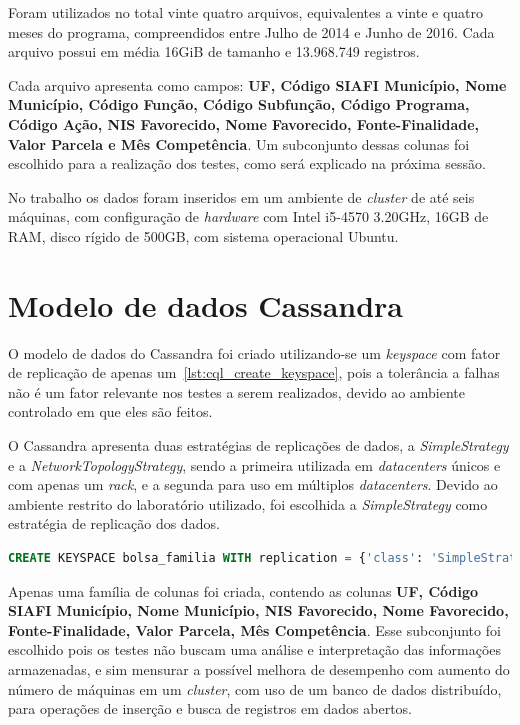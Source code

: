 Foram utilizados no total vinte quatro arquivos, equivalentes a vinte e quatro meses do programa, compreendidos entre Julho de 2014 e Junho de 2016. Cada arquivo possui em média 16GiB de tamanho e 13.968.749 registros.

Cada arquivo apresenta como campos: \textbf{UF, Código SIAFI Município, Nome Município, Código Função, Código Subfunção, Código Programa, Código Ação, NIS Favorecido, Nome Favorecido, Fonte-Finalidade, Valor Parcela e Mês Competência}. Um subconjunto dessas colunas foi escolhido para a realização dos testes, como será explicado na próxima sessão.

No trabalho os dados foram inseridos em um ambiente de \emph{cluster} de até seis máquinas, com configuração de \emph{hardware} com Intel i5-4570 3.20GHz, 16GB de RAM, disco rígido de 500GB, com sistema operacional Ubuntu.

\section{Modelo de dados Cassandra}
O modelo de dados do Cassandra foi criado utilizando-se um \emph{keyspace} com fator de replicação de apenas um~\ref{lst:cql_create_keyspace}, pois a tolerância a falhas não é um fator relevante nos testes a serem realizados, devido ao ambiente controlado em que eles são feitos.

O Cassandra apresenta duas estratégias de replicações de dados, a \emph{SimpleStrategy} e a \emph{NetworkTopologyStrategy}, sendo a primeira utilizada em \emph{datacenters} únicos e com apenas um \emph{rack}, e a segunda para uso em múltiplos \emph{datacenters}. Devido ao ambiente restrito do laboratório utilizado, foi escolhida a \emph{SimpleStrategy} como estratégia de replicação dos dados.

\noindent
\begin{minipage}[c]{1\textwidth}
\begin{lstlisting}[caption={Código CQL criação do keyspace},label={lst:cql_create_keyspace},language=SQL]
CREATE KEYSPACE bolsa_familia WITH replication = {'class': 'SimpleStrategy', 'replication_factor': 1};
\end{lstlisting}
\end{minipage}

Apenas uma família de colunas foi criada, contendo as colunas \textbf{UF, Código SIAFI Município, Nome Município, NIS Favorecido, Nome Favorecido, Fonte-Finalidade, Valor Parcela, Mês Competência}. Esse subconjunto foi escolhido pois os testes não buscam uma análise e interpretação das informações armazenadas, e sim mensurar a possível melhora de desempenho com aumento do número de máquinas em um \emph{cluster}, com uso de um banco de dados distribuído, para operações de inserção e busca de registros em dados abertos.

